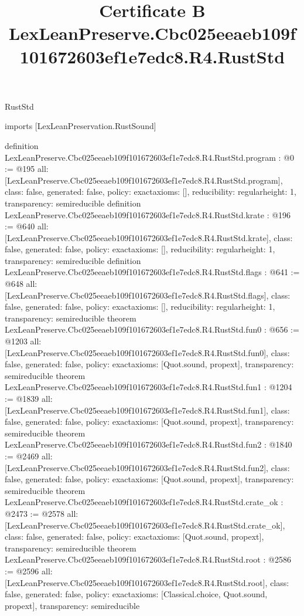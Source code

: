\begin{lexlean}{RustStd}
\title{Certificate B LexLeanPreserve.Cbc025eeaeb109f101672603ef1e7edc8.R4.RustStd}
\begin{coremodule}
imports [LexLeanPreservation.RustSound]

definition LexLeanPreserve.Cbc025eeaeb109f101672603ef1e7edc8.R4.RustStd.program : @0 := @195 {
  all: [LexLeanPreserve.Cbc025eeaeb109f101672603ef1e7edc8.R4.RustStd.program],
  class: false,
  generated: false,
  policy: exact{axioms: []},
  reducibility: regular{height: 1},
  transparency: semireducible
}
definition LexLeanPreserve.Cbc025eeaeb109f101672603ef1e7edc8.R4.RustStd.krate : @196 := @640 {
  all: [LexLeanPreserve.Cbc025eeaeb109f101672603ef1e7edc8.R4.RustStd.krate],
  class: false,
  generated: false,
  policy: exact{axioms: []},
  reducibility: regular{height: 1},
  transparency: semireducible
}
definition LexLeanPreserve.Cbc025eeaeb109f101672603ef1e7edc8.R4.RustStd.flags : @641 := @648 {
  all: [LexLeanPreserve.Cbc025eeaeb109f101672603ef1e7edc8.R4.RustStd.flags],
  class: false,
  generated: false,
  policy: exact{axioms: []},
  reducibility: regular{height: 1},
  transparency: semireducible
}
theorem LexLeanPreserve.Cbc025eeaeb109f101672603ef1e7edc8.R4.RustStd.fun0 : @656 := @1203 {
  all: [LexLeanPreserve.Cbc025eeaeb109f101672603ef1e7edc8.R4.RustStd.fun0],
  class: false,
  generated: false,
  policy: exact{axioms: [Quot.sound, propext]},
  transparency: semireducible
}
theorem LexLeanPreserve.Cbc025eeaeb109f101672603ef1e7edc8.R4.RustStd.fun1 : @1204 := @1839 {
  all: [LexLeanPreserve.Cbc025eeaeb109f101672603ef1e7edc8.R4.RustStd.fun1],
  class: false,
  generated: false,
  policy: exact{axioms: [Quot.sound, propext]},
  transparency: semireducible
}
theorem LexLeanPreserve.Cbc025eeaeb109f101672603ef1e7edc8.R4.RustStd.fun2 : @1840 := @2469 {
  all: [LexLeanPreserve.Cbc025eeaeb109f101672603ef1e7edc8.R4.RustStd.fun2],
  class: false,
  generated: false,
  policy: exact{axioms: [Quot.sound, propext]},
  transparency: semireducible
}
theorem LexLeanPreserve.Cbc025eeaeb109f101672603ef1e7edc8.R4.RustStd.crate_ok : @2473 := @2578 {
  all: [LexLeanPreserve.Cbc025eeaeb109f101672603ef1e7edc8.R4.RustStd.crate_ok],
  class: false,
  generated: false,
  policy: exact{axioms: [Quot.sound, propext]},
  transparency: semireducible
}
theorem LexLeanPreserve.Cbc025eeaeb109f101672603ef1e7edc8.R4.RustStd.root : @2586 := @2596 {
  all: [LexLeanPreserve.Cbc025eeaeb109f101672603ef1e7edc8.R4.RustStd.root],
  class: false,
  generated: false,
  policy: exact{axioms: [Classical.choice, Quot.sound, propext]},
  transparency: semireducible
}


\end{coremodule}
\end{lexlean}
